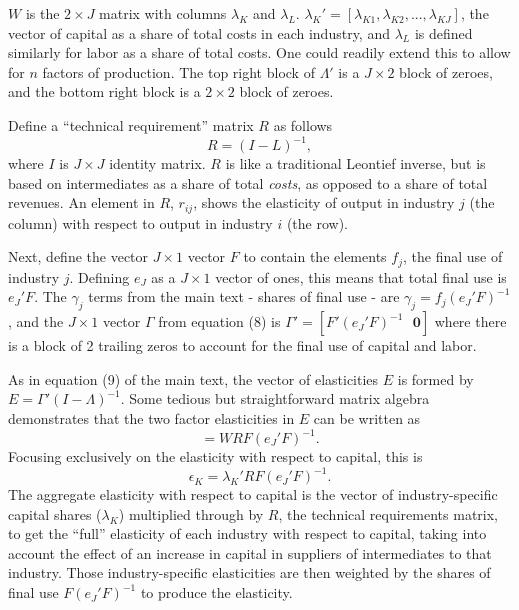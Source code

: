 \documentclass[11pt]{article}
\begin{document}
$W$ is the $2 \times J$ matrix with columns $\lambda_K$ and $\lambda_L$. $\lambda_K' = [\lambda_{K1}, \lambda_{K2}, ..., \lambda_{KJ}]$, the vector of capital as a share of total costs in each industry, and $\lambda_L$ is defined similarly for labor as a share of total costs. One could readily extend this to allow for $n$ factors of production. The top right block of $\Lambda'$ is a $J \times 2$ block of zeroes, and the bottom right block is a $2 \times 2$ block of zeroes. 

Define a ``technical requirement'' matrix $R$ as follows
\begin{equation}
	R = (I - L)^{-1},
\end{equation}
where $I$ is $J \times J$ identity matrix. $R$ is like a traditional Leontief inverse, but is based on intermediates as a share of total \textit{costs}, as opposed to a share of total revenues. An element in $R$, $r_{ij}$, shows the elasticity of output in industry $j$ (the column) with respect to output in industry $i$ (the row).

Next, define the vector $J \times 1$ vector $F$ to contain the elements $f_j$, the final use of industry $j$. Defining $e_J$ as a $J \times 1$ vector of ones, this means that total final use is $e_J'F$. The $\gamma_j$ terms from the main text - shares of final use - are $\gamma_j = f_j(e_J'F)^{-1}$, and the $J \times 1$ vector $\Gamma$ from equation (8) is $\Gamma' = [F'(e_J'F)^{-1} \text{ } \mathbf{0}]$ where there is a block of 2 trailing zeros to account for the final use of capital and labor.

As in equation (9) of the main text, the vector of elasticities $E$ is formed by $E = \Gamma'(I-\Lambda)^{-1}$. Some tedious but straightforward matrix algebra demonstrates that the two factor elasticities in $E$ can be written as
\begin{equation}
	[\epsilon_K \text{ } \epsilon_L] = WRF(e_J'F)^{-1}. 
\end{equation}
Focusing exclusively on the elasticity with respect to capital, this is
\begin{equation}
	\epsilon_K = \lambda_K'RF(e_J'F)^{-1}.
\end{equation}
The aggregate elasticity with respect to capital is the vector of industry-specific capital shares ($\lambda_K$) multiplied through by $R$, the technical requirements matrix, to get the ``full'' elasticity of each industry with respect to capital, taking into account the effect of an increase in capital in suppliers of intermediates to that industry. Those industry-specific elasticities are then weighted by the shares of final use $F(e_J'F)^{-1}$ to produce the elasticity.
\end{document}
